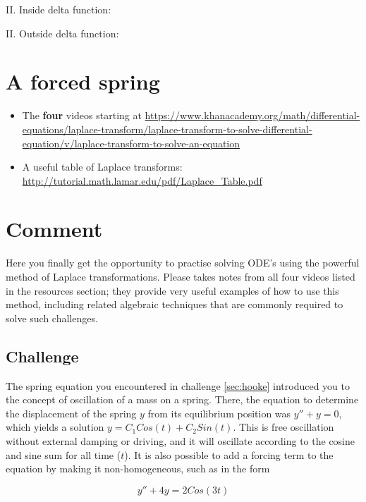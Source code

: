 II. Inside delta function:\\

II. Outside delta function:\\




\newpage
\section{A forced spring}

\begin{itemize}
    \item The \textbf{four} videos starting at \url{https://www.khanacademy.org/math/differential-equations/laplace-transform/laplace-transform-to-solve-differential-equation/v/laplace-transform-to-solve-an-equation}
    \item A useful table of Laplace transforms: \url{http://tutorial.math.lamar.edu/pdf/Laplace_Table.pdf}
\end{itemize}

\section*{Comment}
Here you finally get the opportunity to practise solving ODE's using the powerful method of Laplace transformations. Please takes notes from all four videos listed in the resources section; they provide very useful examples of how to use this method, including related algebraic techniques that are commonly required to solve such challenges.

\subsection*{Challenge}
The spring equation you encountered in challenge \ref{sec:hooke} introduced you to the concept of oscillation of a mass on a spring. There, the equation to determine the displacement of the spring $y$ from its equilibrium position was $y''+y=0$, which yields a solution $y=C_1 Cos(t) + C_2 Sin(t)$. This is free oscillation without external damping or driving, and it will oscillate according to the cosine and sine sum for all time ($t$). It is also possible to add a forcing term to the equation by making it non-homogeneous, such as in the form

\begin{equation}
    y'' + 4y = 2 Cos(3t)
\end{equation}


